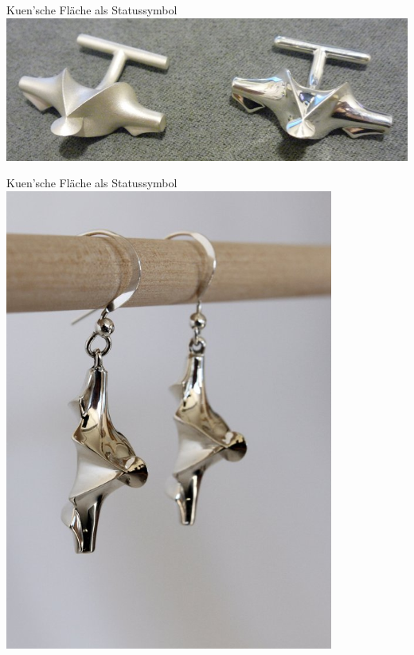 \documentclass[12pt]{beamer}
\begin{document}
\begin{frame}{Kuen'sche Fläche als Statussymbol}
\includegraphics[scale=0.5]{kuen_cuffs.png}
\end{frame}

\begin{frame}{Kuen'sche Fläche als Statussymbol}
\centering
\includegraphics[scale=0.5]{kuen_earrings.png}
\end{frame}
\end{document}
